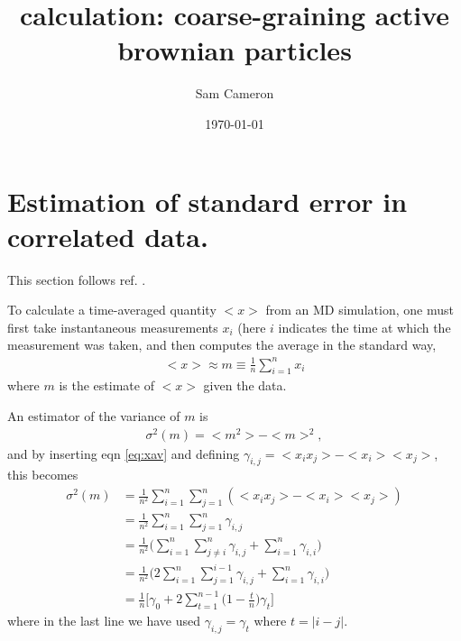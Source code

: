 \documentclass[twocolumn,amsmath,amssymb,aps]{revtex4-1}%
\begin{document}
 
\title{calculation: coarse-graining active brownian particles}
\author{Sam Cameron}
%
\date{\today}

\begin{abstract}
\end{abstract}

\maketitle

\section{Estimation of standard error in correlated data.}

This section follows ref. \cite{doi:10.1063/1.457480}.

To calculate a time-averaged quantity $<x>$ from an MD simulation, one
must first take instantaneous measurements $x_i$ (here $i$ indicates the
time at which the measurement was taken, and then computes the average in
the standard way,
\begin{align}\label{eq:xav}
  <x>\approx m \equiv \frac{1}{n}\sum_{i=1}^nx_i
\end{align}
where $m$ is the estimate of $<x>$ given the data.

An estimator of the variance of $m$ is
\begin{align}\label{eq:sigma_est}
  \sigma^2(m) = <m^2>-<m>^2,
\end{align}
and by inserting eqn \ref{eq:xav} and defining
$\gamma_{i,j}=<x_ix_j>-<x_i><x_j>$, this becomes
\begin{align}
  \sigma^2(m)
  &= \frac{1}{n^2}\sum_{i=1}^n\sum_{j=1}^n(<x_ix_j>-<x_i><x_j>)
  \nonumber\\
  &= \frac{1}{n^2}\sum_{i=1}^n\sum_{j=1}^n\gamma_{i,j}\nonumber\\
  &=\frac{1}{n^2}\bigg(\sum_{i=1}^n\sum_{j\neq i}^n\gamma_{i,j}
  + \sum_{i=1}^n\gamma_{i,i}\bigg)\nonumber\\
  &=\frac{1}{n^2}\bigg(2\sum_{i=1}^n\sum_{j=1}^{i-1}\gamma_{i,j}
  + \sum_{i=1}^n\gamma_{i,i}\bigg)\nonumber\\
  &=\frac{1}{n}\bigg[\gamma_0
    +2\sum_{t=1}^{n-1}\bigg(1-\frac{t}{n}\bigg)\gamma_t\bigg]
\end{align}
where in the last line we have used $\gamma_{i,j}=\gamma_t$ where $t=|i-j|$.
\end{document}
